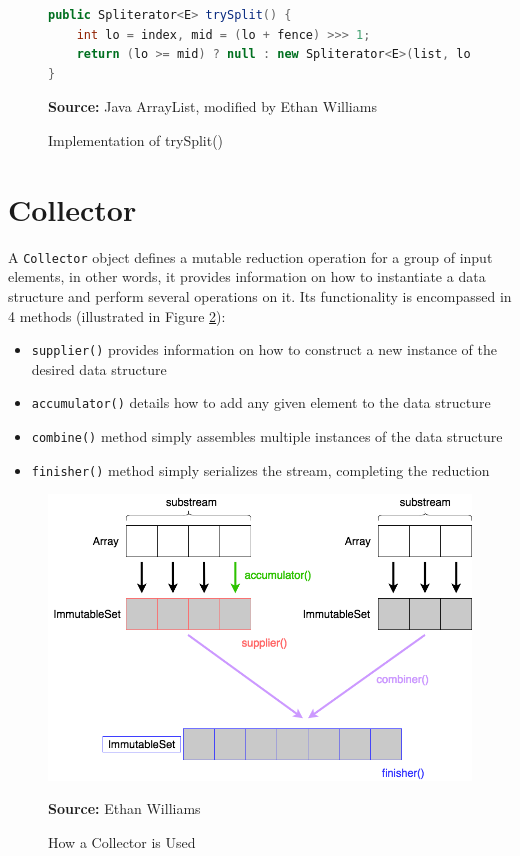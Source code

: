 \documentclass[oneside, 12pt]{article}
\newcommand{\source}[1]{\textbf{Source:} {#1} }
\begin{document}
\begin{figure}[H]
\centering
\begin{lstlisting}[language=Java]
public Spliterator<E> trySplit() {
    int lo = index, mid = (lo + fence) >>> 1;
    return (lo >= mid) ? null : new Spliterator<E>(list, lo, index = mid);
}
\end{lstlisting}
\caption{Implementation of trySplit()}
\source{Java ArrayList, modified by Ethan Williams}
\label{fig:trySplit}
\end{figure}

\section{Collector}
A \verb|Collector| object defines a mutable reduction operation for a group of input elements, in other words, it provides information on how to instantiate a data structure and perform several operations on it. Its functionality is encompassed in 4 methods (illustrated in Figure \ref{fig:collector}):

\begin{itemize}
\item \verb|supplier()| provides information on how to construct a new instance of the desired data structure
\item \verb|accumulator()| details how to add any given element to the data structure
\item \verb|combine()| method simply assembles multiple instances of the data structure
\item \verb|finisher()| method simply serializes the stream, completing the reduction
\end{itemize}

\begin{figure}[H]
\centering
\includegraphics[width=13cm]{../images/collector.png}
\caption{How a Collector is Used}
\source{Ethan Williams}
\label{fig:collector}
\end{figure}
\end{document}
